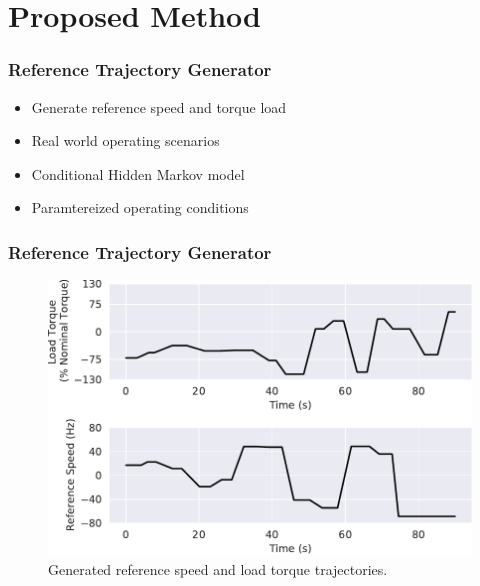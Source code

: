 \documentclass{beamer}
\begin{document}
\section{Proposed Method}

\begin{frame}
\frametitle{Reference Trajectory Generator}

\begin{itemize}
    \item Generate reference speed and torque load
    \item Real world operating scenarios
    \item Conditional Hidden Markov model
    \item Paramtereized operating conditions
\end{itemize}

\end{frame}

\begin{frame}
\frametitle{Reference Trajectory Generator}

\begin{figure}[ht!]
    \centering
        \includegraphics[scale=0.5]{images/train.pdf}
    \caption{Generated reference speed and load torque trajectories.}
    \label{fig:random}
    \vspace{-1em}
\end{figure}

\end{frame}
\end{document}
